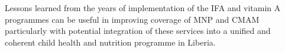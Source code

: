 \documentclass[12pt,a4paper]{article}
\begin{document}
Lessons learned from the years of implementation of the IFA and vitamin A programmes can be useful in improving coverage of MNP and CMAM particularly with potential integration of these services into a unified and coherent child health and nutrition programme in Liberia.

\renewcommand\refname{References}

\end{document}
